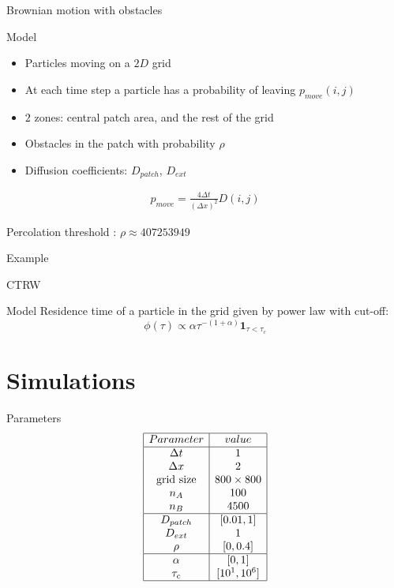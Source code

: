 \documentclass{beamer}
\begin{document}
\begin{frame}{Brownian motion with obstacles}
\begin{block}{Model}
\begin{itemize}
\itemsep1em
\item Particles moving on a $2D$ grid
\item At each time step a particle has a probability of leaving $p_{move}(i,j)$
\item $2$ zones: central patch area, and the rest of the grid
\item Obstacles in the patch with probability $\rho$
\item Diffusion coefficients: $D_{patch}$, $D_{ext}$
\end{itemize}
\end{block}

\begin{align*}
p_{move} = \frac{4 \Delta t}{(\Delta x)^2} D(i,j)
\end{align*}

Percolation threshold : $\rho \approx 407253949$


\end{frame}

\begin{frame}
\begin{center}
\Huge \color{blue} Example
\end{center}
\end{frame}

\begin{frame}{CTRW}
\begin{block}{Model}
Residence time of a particle in the grid given by power law with cut-off: 
$$ \phi(\tau) \propto \alpha \tau^{-(1+\alpha)} \mathbf{1}_{\tau < \tau_c}$$
\end{block}

\end{frame}


\section{Simulations}

\begin{frame}{Parameters}
$$
\begin{array}{|c|c|}
\hline
Parameter & value \\
\hline
\Delta t & 1 \\
\Delta x & 2 \\
\text{grid size} & 800 \times 800 \\
n_A & 100 \\
n_B & 4500 \\
\hline
D_{patch} & [0.01, 1] \\
D_{ext} & 1 \\
\rho & [0, 0.4] \\
\hline
\alpha & [0,1] \\
\tau_c & [10^1, 10^6] \\
\hline
\end{array}
$$
\end{frame}
\end{document}
